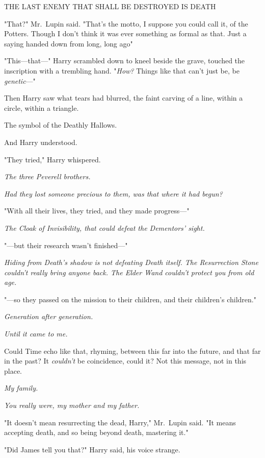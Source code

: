 \begin{center}
THE LAST ENEMY THAT SHALL BE DESTROYED IS DEATH
\end{center}

"That?" Mr.~Lupin said. "That's the{\el} motto, I suppose you could call it,
of the Potters. Though I don't think it was ever something as formal as that.
Just a saying handed down from long, long ago{\el}"

"This—that—" Harry scrambled down to kneel beside the grave, touched the
inscription with a trembling hand. "\emph{How?} Things like that can't just be,
be \emph{genetic}—"

Then Harry saw what tears had blurred, the faint carving of a line, within a
circle, within a triangle.

The symbol of the Deathly Hallows.

And Harry understood.

"They tried," Harry whispered.

\emph{The three Peverell brothers.}

\emph{Had they lost someone precious to them, was that where it had begun?}

"With all their lives, they tried, and they made progress—"

\emph{The Cloak of Invisibility, that could defeat the Dementors' sight.}

"—but their research wasn't finished—"

\emph{Hiding from Death's shadow is not defeating Death itself. The
Resurrection Stone couldn't really bring anyone back. The Elder Wand couldn't
protect you from old age.}

"—so they passed on the mission to their children, and their children's
children."

\emph{Generation after generation.}

\emph{Until it came to me.}

Could Time echo like that, rhyming, between this far into the future, and that
far in the past? It \emph{couldn't} be coincidence, could it? Not this message,
not in this place.

\emph{My family.}

\emph{You really were, my mother and my father.}

"It doesn't mean resurrecting the dead, Harry," Mr.~Lupin said. "It means
accepting death, and so being beyond death, mastering it."

"Did James tell you that?" Harry said, his voice strange.

